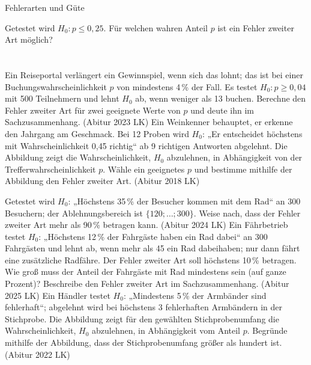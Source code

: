 \begin{aufgabe}{Fehlerarten und Güte}
\begin{teile}
\teil Getestet wird $H_0\colon p \le 0{,}25$. Für welchen wahren Anteil $p$ ist ein Fehler zweiter Art möglich? \\  \\  \\ 
\teil Ein Reiseportal verlängert ein Gewinnspiel, wenn sich das lohnt; das ist bei einer Buchungswahrscheinlichkeit $p$ von mindestens 4\,\% der Fall. Es testet $H_0\colon p \ge 0{,}04$ mit 500 Teilnehmern und lehnt $H_0$ ab, wenn weniger als 13 buchen. Berechne den Fehler zweiter Art für zwei geeignete Werte von $p$ und deute ihn im Sachzusammenhang. \hfill (Abitur 2023 LK)
\teil Ein Weinkenner behauptet, er erkenne den Jahrgang am Geschmack. Bei 12 Proben wird $H_0$: „Er entscheidet höchstens mit Wahrscheinlichkeit 0,45 richtig“ ab 9 richtigen Antworten abgelehnt. Die Abbildung zeigt die Wahrscheinlichkeit, $H_0$ abzulehnen, in Abhängigkeit von der Trefferwahrscheinlichkeit $p$. Wähle ein geeignetes $p$ und bestimme mithilfe der Abbildung den Fehler zweiter Art. \hfill (Abitur 2018 LK)

\begin{ksys}[xmin=0,xmax=1,ymin=0,ymax=1,xstep=0.1,ystep=0.1,ablesen,xlabel=$p$]\end{ksys}
\teil Getestet wird $H_0$: „Höchstens 35\,\% der Besucher kommen mit dem Rad“ an 300 Besuchern; der Ablehnungsbereich ist $\{120; \ldots; 300\}$. Weise nach, dass der Fehler zweiter Art mehr als 90\,\% betragen kann. \hfill (Abitur 2024 LK)
\teil Ein Fährbetrieb testet $H_0$: „Höchstens 12\,\% der Fahrgäste haben ein Rad dabei“ an 300 Fahrgästen und lehnt ab, wenn mehr als 45 ein Rad dabeihaben; nur dann fährt eine zusätzliche Radfähre. Der Fehler zweiter Art soll höchstens 10\,\% betragen. Wie groß muss der Anteil der Fahrgäste mit Rad mindestens sein (auf ganze Prozent)? Beschreibe den Fehler zweiter Art im Sachzusammenhang. \hfill (Abitur 2025 LK)
\teil Ein Händler testet $H_0$: „Mindestens 5\,\% der Armbänder sind fehlerhaft“; abgelehnt wird bei höchstens 3 fehlerhaften Armbändern in der Stichprobe. Die Abbildung zeigt für den gewählten Stichprobenumfang die Wahrscheinlichkeit, $H_0$ abzulehnen, in Abhängigkeit vom Anteil $p$. Begründe mithilfe der Abbildung, dass der Stichprobenumfang größer als hundert ist. \hfill (Abitur 2022 LK)

\begin{ksys}[xmin=0,xmax=0.1,ymin=0,ymax=1,xstep=0.01,ystep=0.1,ablesen,xlabel=$p$]\end{ksys}
\end{teile}
\end{aufgabe}

